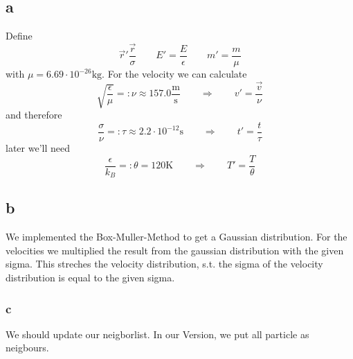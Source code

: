 \subsection{a}
Define
\begin{equation}\label{redef1}
\vec{r}' \frac{\vec{r}}{\sigma} \qquad E' = \frac{E}{\epsilon} \qquad m' = \frac{m}{ \mu }
\end{equation}
with $\mu=6.69 \cdot 10^{-26} \mathrm{kg}$.
For the velocity we can calculate
\begin{equation}\label{redef_v}
\sqrt{\frac{\epsilon}{\mu}} =: \nu \approx 157.0 \frac{\mathrm{m}}{\mathrm{s}} \qquad \Rightarrow \qquad v' = \frac{\vec{v}}{\nu}
\end{equation}
and therefore 
\begin{equation}\label{redef_t}
\frac{\sigma}{\nu} =: \tau \approx   2.2 \cdot 10^{-12} \mathrm{s}    \qquad \Rightarrow \qquad t' = \frac{t}{\tau}
\end{equation}
later we'll need 
\begin{equation}\label{redef_T}
\frac{\epsilon}{k_B} =:\theta = 120 \mathrm{K} \qquad \Rightarrow \qquad T' = \frac{T}{\theta}
\end{equation}
\subsection{b}
We implemented the Box-Muller-Method to get a Gaussian distribution. For the velocities we multiplied the result from the gaussian distribution with the given sigma. This streches the velocity distribution, s.t. the sigma of the velocity distribution is equal to the given sigma.
\subsubsection{c}
We should update our neigborlist. In our Version, we put all particle as neigbours.
